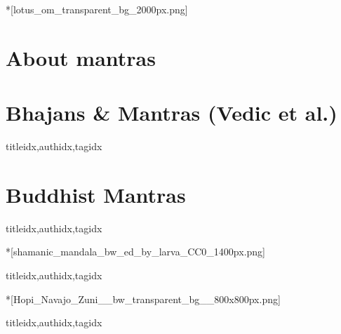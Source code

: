 
  \setcounter{chapter}{2}

  *[lotus_om_transparent_bg_2000px.png]
    \section{About mantras}
      
    \clearpage\scleardpage
    \section{Bhajans \& Mantras (Vedic et al.)}
      \begin{songs}{titleidx,authidx,tagidx}
        
      \end{songs}
    \scleardpage
    \section{Buddhist Mantras}
      \begin{songs}{titleidx,authidx,tagidx}
        
      \end{songs}

  *[shamanic_mandala_bw_ed_by_larva_CC0_1400px.png]
    \begin{songs}{titleidx,authidx,tagidx}
      
    \end{songs}

  *[Hopi_Navajo_Zuni__bw_transparent_bg__800x800px.png]
    \begin{songs}{titleidx,authidx,tagidx}
      
    \end{songs}

